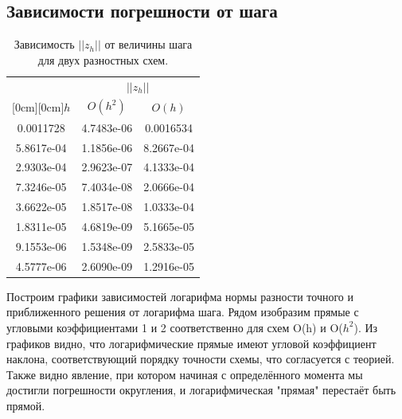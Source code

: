 \documentclass[12pt]{article}
\begin{document}
\subsection{Зависимости погрешности от шага}

\begin{table}[H]
\caption{\label{tab:zh} Зависимость $||z_h||$ от величины шага для двух разностных схем.}
\begin{center}
\begin{tabular}{|c|c|c|}
\hline
& \multicolumn{2}{c|}{$||z_h||$} \\
\cline{2-3}
\raisebox{1.5ex}[0cm][0cm]{$h$}
& $O(h^2)$ & $O(h)$ \\
\hline
0.0011728 & 4.7483e-06 & 0.0016534 \\
\hline
5.8617e-04 & 1.1856e-06 & 8.2667e-04 \\
\hline
2.9303e-04 & 2.9623e-07 & 4.1333e-04 \\
\hline
7.3246e-05 & 7.4034e-08 & 2.0666e-04 \\
\hline
3.6622e-05 & 1.8517e-08 & 1.0333e-04 \\
\hline
1.8311e-05 & 4.6819e-09 & 5.1665e-05 \\
\hline
9.1553e-06 & 1.5348e-09 & 2.5833e-05 \\
\hline
4.5777e-06 & 2.6090e-09 & 1.2916e-05 \\
\hline
\end{tabular}
\end{center}
\end{table}

Построим графики зависимостей логарифма нормы разности точного и приближенного решения от логарифма шага. Рядом изобразим прямые с угловыми коэффициентами 1 и 2 соответственно для схем O(h) и O($h^2$). Из графиков видно, что логарифмические прямые имеют угловой коэффициент наклона, соответствующий порядку точности схемы, что согласуется с теорией. Также видно явление, при котором начиная с определённого момента мы достигли погрешности округления, и логарифмическая "прямая" перестаёт быть прямой.
\end{document}
